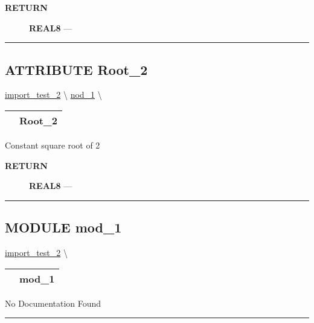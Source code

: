 \par
\begin{description}
\item [\colorbox{tagtype}{\color{white} \textbf{\textsf{RETURN}}}] \textbf{REAL8} --- 
\end{description}




\rule{\linewidth}{0.5pt}
\subsection*{\textsf{\colorbox{headtoc}{\color{white} ATTRIBUTE}
Root\_2}}

\hypertarget{ecldoc:ml_core.constants.root_2}{}
\hspace{0pt} \hyperlink{ecldoc:import_test_2}{import_test_2} \textbackslash 
\hspace{0pt} \hyperlink{ecldoc:ML_Core.Constants}{nod_1} \textbackslash 

{\renewcommand{\arraystretch}{1.5}
\begin{tabularx}{\textwidth}{|>{\raggedright\arraybackslash}l|X|}
\hline
\hspace{0pt}\mytexttt{\color{red} } & \textbf{Root\_2} \\
\hline
\end{tabularx}
}

\par





Constant square root of 2








\par
\begin{description}
\item [\colorbox{tagtype}{\color{white} \textbf{\textsf{RETURN}}}] \textbf{REAL8} --- 
\end{description}




\rule{\linewidth}{0.5pt}


\subsection*{\textsf{\colorbox{headtoc}{\color{white} MODULE}
mod\_1}}

\hypertarget{ecldoc:PBblas}{}
\hspace{0pt} \hyperlink{ecldoc:import_test_2}{import_test_2} \textbackslash 

{\renewcommand{\arraystretch}{1.5}
\begin{tabularx}{\textwidth}{|>{\raggedright\arraybackslash}l|X|}
\hline
\hspace{0pt}\mytexttt{\color{red} } & \textbf{mod\_1} \\
\hline
\end{tabularx}
}

\par





No Documentation Found







\rule{\linewidth}{0.5pt}


